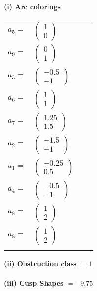 \documentclass[1p]{elsarticle_modified}
\theoremstyle{definition}
\begin{document}
\flushleft \textbf{(i) Arc colorings}\\
\begin{tabular}{m{7pt} m{180pt} m{7pt} m{180pt} }
\flushright $a_{5}=$&$\begin{pmatrix}1\\0\end{pmatrix}$ \\
\flushright $a_{9}=$&$\begin{pmatrix}0\\1\end{pmatrix}$ \\
\flushright $a_{3}=$&$\begin{pmatrix}-0.5\\-1\end{pmatrix}$ \\
\flushright $a_{6}=$&$\begin{pmatrix}1\\1\end{pmatrix}$ \\
\flushright $a_{7}=$&$\begin{pmatrix}1.25\\1.5\end{pmatrix}$ \\
\flushright $a_{2}=$&$\begin{pmatrix}-1.5\\-1\end{pmatrix}$ \\
\flushright $a_{1}=$&$\begin{pmatrix}-0.25\\0.5\end{pmatrix}$ \\
\flushright $a_{4}=$&$\begin{pmatrix}-0.5\\-1\end{pmatrix}$ \\
\flushright $a_{8}=$&$\begin{pmatrix}1\\2\end{pmatrix}$\\ \flushright $a_{8}=$&$\begin{pmatrix}1\\2\end{pmatrix}$\\&\end{tabular}
\flushleft \textbf{(ii) Obstruction class $= 1$}\\~\\
\flushleft \textbf{(iii) Cusp Shapes $= -9.75$}\\~\\
\end{document}
